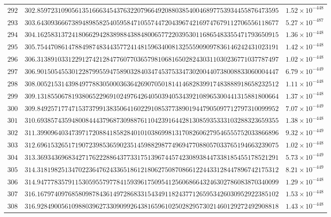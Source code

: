 \documentclass[12pt,reqno]{amsart}
\theoremstyle{remark}
\begin{document}
\begin{longtable}{clc}
$292$ & $302.8597231090561351666345437632207966492088038540046897753934455876473595$ & $1.52\times 10^{-448}$ \\
$293$ & $303.6430936667389489858254059584710557447204396742169747679112706556118677$ & $5.27\times 10^{-487}$ \\
$294$ & $304.1625831372418066294283898843884800657722039530116865483355471793650915$ & $1.36\times 10^{-448}$ \\
$295$ & $305.7544708614788498748344357724148159634008132555909097836146242431023191$ & $1.42\times 10^{-448}$ \\
$296$ & $306.3138910331229127421284776077036579810681650282430311030236771037787497$ & $1.02\times 10^{-448}$ \\
$297$ & $306.9015054553012287995594758903284034745375334730200440738008833060004447$ & $6.79\times 10^{-449}$ \\
$298$ & $308.0052153143984977883050003636426907050181414682839917483888918658232512$ & $1.11\times 10^{-448}$ \\
$299$ & $309.1318550678193806522969102497642640503940534392108965300441315881800664$ & $1.37\times 10^{-448}$ \\
$300$ & $309.8492571774715373799138350641602291085377389019447905097712797310099952$ & $7.07\times 10^{-449}$ \\
$301$ & $310.6938574359480084443796873098876110423916442813085935333103288323659355$ & $1.38\times 10^{-448}$ \\
$302$ & $311.3990964034739717208841858284010103869981317082606279546555752033866896$ & $9.32\times 10^{-449}$ \\
$303$ & $312.6961532651719072398536590235145988298774969477088057033765194663239075$ & $1.02\times 10^{-448}$ \\
$304$ & $313.3693436968342717622288643773317513967445742308938447338185455178521291$ & $5.73\times 10^{-449}$ \\
$305$ & $314.3181982513470223647624336518612180627508708661224433128447896742175312$ & $8.21\times 10^{-449}$ \\
$306$ & $314.9477783579115305955797784159396175095412560686643246302786083870340099$ & $1.29\times 10^{-448}$ \\
$307$ & $316.1679740976858098784361497286833154349118243771265953426030952922385102$ & $1.53\times 10^{-448}$ \\
$308$ & $316.9284900561098803962733090992643816596102502829573021460129272492908818$ & $1.43\times 10^{-448}$ \\

\end{longtable}
\end{document}
